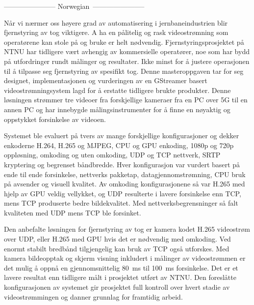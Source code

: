 ----------------------- Norwegian~-----------------------

Når vi nærmer oss høyere grad av automatisering i jernbaneindustrien blir fjernstyring av tog viktigere. A ha en pålitelig og rask videostrømning som operatørene kan stole på og bruke er helt nødvendig. Fjernstyringsprosjektet på NTNU har tidligere vært avhengig av kommersielle operatører, noe som har bydd på utfordringer rundt målinger og resultater. Ikke minst for å justere operasjonen til å tilpasse seg fjernstyring av spesifikt tog. Denne masteroppgaven tar for seg designet, implementasjonen og vurderingen av en GStreamer basert videostrømningsystem lagd for å erstatte tidligere brukte produkter. Denne løsningen strømmer tre videoer fra forskjellige kameraer fra en PC over 5G til en annen PC og har innebygde målingsinstrumenter for å finne en nøyaktig og oppstykket forsinkelse av videoen.

Systemet ble evaluert på tvers av mange forskjellige konfigurasjoner og dekker enkoderne H.264, H.265 og MJPEG, CPU og GPU enkoding, 1080p og 720p oppløsning, omkoding og uten omkoding, UDP og TCP nettverk, SRTP kryptering og begrenset båndbredde. Hver konfigurasjon var vurdert basert på ende til ende forsinkelse, nettverks pakketap, datagjennomstrømning, CPU bruk på avsender og visuell kvalitet. Av omkoding konfigurasjonene så var H.265 med hjelp av GPU veldig vellykket, og UDP resulterte i lavere forsinkelse enn TCP, mens TCP produserte bedre bildekvalitet. Med nettverksbegrensninger så falt kvaliteten med UDP mens TCP ble forsinket.

Den anbefalte løsningen for fjernstyring av tog er kamera kodet H.265 videostrøm over UDP, eller H.265 med GPU hvis det er nødvendig med omkoding. Ved enormt stabilt bredbånd tilgjengelig kan bruk av TCP også utforskes. Med kamera bildeopptak og skjerm visning inkludert i målinger av videostrømmen er det mulig å oppnå en gjennomsnittelig 80~ms til 100~ms forsinkelse. Det er et lavere resultat enn tidligere målt i prosjektet utført av NTNU. Den foreslåtte konfigurasjonen av systemet gir prosjektet full kontroll over hvert stadie av videostrømmingen og danner grunnlag for framtidig arbeid.